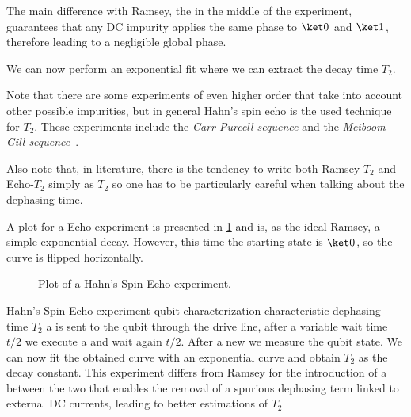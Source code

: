 The main difference with Ramsey, the \pipulse in the middle of the experiment, guarantees that any DC impurity applies the same phase to $\ket 0$ and $\ket 1$, therefore leading to a negligible global phase.

We can now perform an exponential fit where we can extract the decay time $T_2$.

Note that there are some experiments of even higher order that take into account other possible impurities, but in general Hahn's spin echo is the used technique for $T_2$.
These experiments include the \textit{Carr-Purcell sequence} and the \textit{Meiboom-Gill sequence}~\cite{PurcellGill}.

Also note that, in literature, there is the tendency to write both Ramsey-$T_2$ and Echo-$T_2$ simply as $T_2$ so one has to be particularly careful when talking about the dephasing time.

A plot for a Echo experiment is presented in \cref{fig:echo} and is, as the ideal Ramsey, a simple exponential decay. However, this time the starting state is $\ket 0$, so the curve is flipped horizontally.

\begin{figure}[ht]
    \caption{Plot of a Hahn's Spin Echo experiment.}
    \label{fig:echo}
\end{figure}


\experimentrecap
{Hahn's Spin Echo experiment}
{qubit characterization}
{characteristic dephasing time $T_2$}
{a \pihpulse is sent to the qubit through the drive line, after a variable wait time $t/2$ we execute a \pipulse and wait again $t/2$. After a new \pihpulse we measure the qubit state.
We can now fit the obtained curve with an exponential curve and obtain $T_2$ as the decay constant. This experiment differs from Ramsey for the introduction of a \pipulse between the two \pihpulse that enables the removal of a spurious dephasing term linked to external DC currents, leading to better estimations of $T_2$}